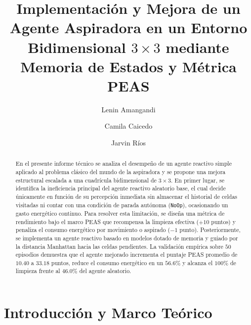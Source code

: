 \documentclass[runningheads]{llncs}
\begin{document}
\title{Implementación y Mejora de un Agente Aspiradora en un Entorno Bidimensional $3\times 3$ mediante Memoria de Estados y Métrica PEAS}

\author{Lenin Amangandi \and Camila Caicedo \and Jarvin Ríos}


\maketitle

\begin{abstract}
En el presente informe técnico se analiza el desempeño de un agente reactivo simple aplicado al problema clásico del mundo de la aspiradora y se propone una mejora estructural escalada a una cuadrícula bidimensional de $3\times 3$. En primer lugar, se identifica la ineficiencia principal del agente reactivo aleatorio base, el cual decide únicamente en función de su percepción inmediata sin almacenar el historial de celdas visitadas ni contar con una condición de parada autónoma (\texttt{NoOp}), ocasionando un gasto energético continuo. Para resolver esta limitación, se diseña una métrica de rendimiento bajo el marco PEAS que recompensa la limpieza efectiva ($+10$ puntos) y penaliza el consumo energético por movimiento o aspirado ($-1$ punto). Posteriormente, se implementa un agente reactivo basado en modelos dotado de memoria y guiado por la distancia Manhattan hacia las celdas pendientes. La validación empírica sobre $50$ episodios demuestra que el agente mejorado incrementa el puntaje PEAS promedio de $10.40$ a $33.18$ puntos, reduce el consumo energético en un $56.6\%$ y alcanza el $100\%$ de limpieza frente al $46.0\%$ del agente aleatorio.

\end{abstract}

\section{Introducción y Marco Teórico}
\end{document}
